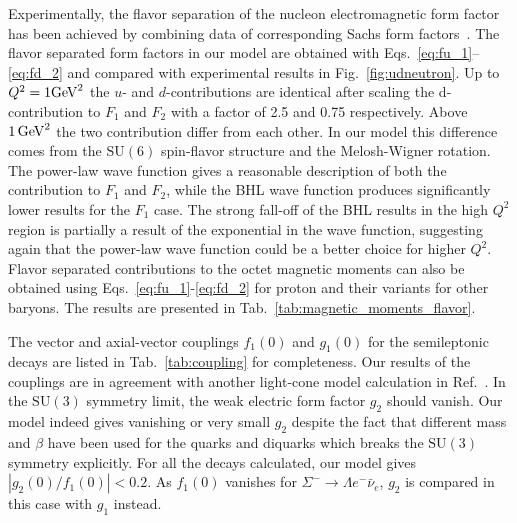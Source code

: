 \documentclass[aps,prc,preprint,groupedaddress,showpacs,superscriptaddress,floatfix]{revtex4-1}
\newcommand{\GeV}{\ensuremath\mathrm{GeV}}
\begin{document}
Experimentally, the flavor separation of the nucleon electromagnetic form factor has been achieved by combining data of corresponding Sachs form factors~\cite{cates_flavor_2011}. 
The flavor separated form factors in our model are obtained with Eqs.~\eqref{eq:fu_1}--\eqref{eq:fd_2} and compared with experimental results in Fig.~\ref{fig:udneutron}. 
Up to $Q^2=1 \GeV^2$ the $u$- and $d$-contributions are identical after scaling the d-contribution to $F_1$ and $F_2$ with a factor of 2.5 and 0.75 respectively. 
Above $1\,\GeV^2$ the two contribution differ from each other. 
In our model this difference comes from the $\mathrm{SU}(6)$ spin-flavor structure and the Melosh-Wigner rotation. 
The power-law wave function gives a reasonable description of both the contribution to $F_1$ and $F_2$, while the BHL wave function produces significantly lower results for the $F_1$ case. 
The strong fall-off of the BHL results in the high $Q^2$ region is partially a result of the exponential in the wave function, suggesting again that the power-law wave function could be a better choice for higher $Q^2$.
Flavor separated contributions to the octet magnetic moments can also be obtained using Eqs.~\eqref{eq:fu_1}-\eqref{eq:fd_2} for proton and their variants for other baryons. The results are presented in Tab.~\ref{tab:magnetic_moments_flavor}.

The vector and axial-vector couplings $f_1(0)$ and $g_1(0)$ for the semileptonic decays are listed in Tab.~\ref{tab:coupling} for completeness.
Our results of the couplings are in agreement with another light-cone model calculation in Ref.~\cite{schlumpf_relativistic_1994}.
In the $\mathrm{SU}(3)$ symmetry limit, the weak electric form factor $g_2$ should vanish.
Our model indeed gives vanishing or very small $g_2$ despite the fact that different mass and $\beta$ have been used for the quarks and diquarks which breaks the $\mathrm{SU}(3)$ symmetry explicitly.
For all the decays calculated, our model gives $|g_2(0)/f_1(0)|<0.2$. As $f_1(0)$ vanishes for $\Sigma^- \to \Lambda e^- \bar{\nu}_e$, $g_2$ is compared in this case with $g_1$ instead.
\end{document}
